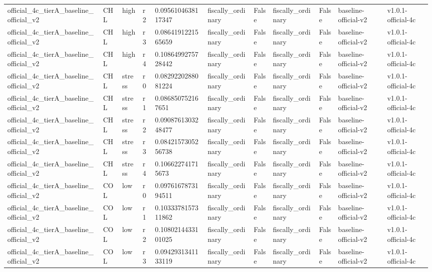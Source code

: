 \begin{landscape}
\begin{longtable}{lllllllllll}
official\_4c\_tierA\_baseline\_official\_v2 & CHL & high & r2 & 0.0956104638117347 & fiscally\_ordinary & False & fiscally\_ordinary & False & baseline-official-v2 & v1.0.1-official-4c \\
official\_4c\_tierA\_baseline\_official\_v2 & CHL & high & r3 & 0.0864191221565659 & fiscally\_ordinary & False & fiscally\_ordinary & False & baseline-official-v2 & v1.0.1-official-4c \\
official\_4c\_tierA\_baseline\_official\_v2 & CHL & high & r4 & 0.1086499275728442 & fiscally\_ordinary & False & fiscally\_ordinary & False & baseline-official-v2 & v1.0.1-official-4c \\
official\_4c\_tierA\_baseline\_official\_v2 & CHL & stress & r0 & 0.0829220288081224 & fiscally\_ordinary & False & fiscally\_ordinary & False & baseline-official-v2 & v1.0.1-official-4c \\
official\_4c\_tierA\_baseline\_official\_v2 & CHL & stress & r1 & 0.086850752167651 & fiscally\_ordinary & False & fiscally\_ordinary & False & baseline-official-v2 & v1.0.1-official-4c \\
official\_4c\_tierA\_baseline\_official\_v2 & CHL & stress & r2 & 0.0908761303248477 & fiscally\_ordinary & False & fiscally\_ordinary & False & baseline-official-v2 & v1.0.1-official-4c \\
official\_4c\_tierA\_baseline\_official\_v2 & CHL & stress & r3 & 0.0842157305256738 & fiscally\_ordinary & False & fiscally\_ordinary & False & baseline-official-v2 & v1.0.1-official-4c \\
official\_4c\_tierA\_baseline\_official\_v2 & CHL & stress & r4 & 0.106622741715673 & fiscally\_ordinary & False & fiscally\_ordinary & False & baseline-official-v2 & v1.0.1-official-4c \\
official\_4c\_tierA\_baseline\_official\_v2 & COL & low & r0 & 0.0976167873194511 & fiscally\_ordinary & False & fiscally\_ordinary & False & baseline-official-v2 & v1.0.1-official-4c \\
official\_4c\_tierA\_baseline\_official\_v2 & COL & low & r1 & 0.1033378157311862 & fiscally\_ordinary & False & fiscally\_ordinary & False & baseline-official-v2 & v1.0.1-official-4c \\
official\_4c\_tierA\_baseline\_official\_v2 & COL & low & r2 & 0.1080214433101025 & fiscally\_ordinary & False & fiscally\_ordinary & False & baseline-official-v2 & v1.0.1-official-4c \\
official\_4c\_tierA\_baseline\_official\_v2 & COL & low & r3 & 0.0942931341133119 & fiscally\_ordinary & False & fiscally\_ordinary & False & baseline-official-v2 & v1.0.1-official-4c \\

\end{longtable}
\end{landscape}
